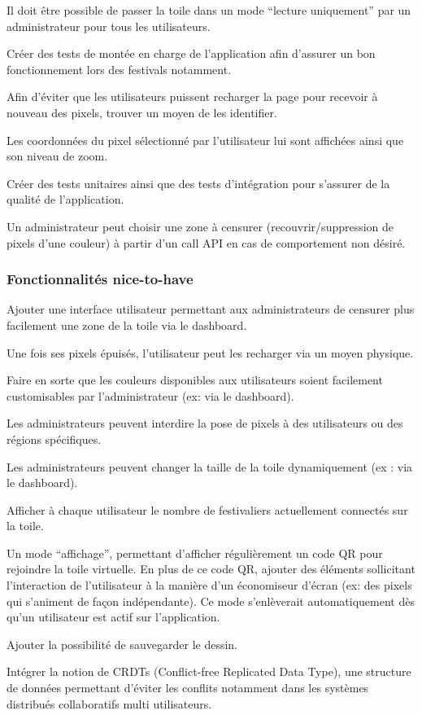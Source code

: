 \begin{todolist}
  \item[\done] Il doit être possible de passer la toile dans un mode “lecture uniquement” par un administrateur pour tous les utilisateurs.
  \item[\done] Créer des tests de montée en charge de l'application afin d'assurer un bon fonctionnement lors des festivals notamment.
  \item[\done] Afin d'éviter que les utilisateurs puissent recharger la page pour recevoir à nouveau des pixels, trouver un moyen de les identifier.
  \item[\done] Les coordonnées du pixel sélectionné par l'utilisateur lui sont affichées ainsi que son niveau de zoom.
  \item Créer des tests unitaires ainsi que des tests d'intégration pour s'assurer de la qualité de l'application.
  \item[\done] Un administrateur peut choisir une zone à censurer (recouvrir/suppression de pixels d'une couleur) à partir d'un call API en cas de comportement non désiré.
\end{todolist}

\subsubsection{Fonctionnalités \guillemotleft nice-to-have\guillemotright}

\begin{todolist}
  \item Ajouter une interface utilisateur permettant aux administrateurs de censurer plus facilement une zone de la toile via le dashboard.
  \item Une fois ses pixels épuisés, l'utilisateur peut les recharger via un moyen physique.
  \item[\done] Faire en sorte que les couleurs disponibles aux utilisateurs soient facilement customisables par l'administrateur (ex: via le dashboard).
  \item Les administrateurs peuvent interdire la pose de pixels à des utilisateurs ou des régions spécifiques.
  \item[\done] Les administrateurs peuvent changer la taille de la toile dynamiquement (ex : via le dashboard).
  \item[\done] Afficher à chaque utilisateur le nombre de festivaliers actuellement connectés sur la toile.
  \item[\done] Un mode “affichage”, permettant d'afficher régulièrement un code QR pour rejoindre la toile virtuelle. En plus de ce code QR, ajouter des éléments sollicitant l'interaction de l'utilisateur à la manière d'un économiseur d'écran (ex: des pixels qui s'animent de façon indépendante). Ce mode s'enlèverait automatiquement dès qu'un utilisateur est actif sur l'application.
  \item[\done] Ajouter la possibilité de sauvegarder le dessin.
  \item Intégrer la notion de CRDTs (Conflict-free Replicated Data Type), une structure de données permettant d'éviter les conflits notamment dans les systèmes distribués collaboratifs multi utilisateurs.
\end{todolist}

